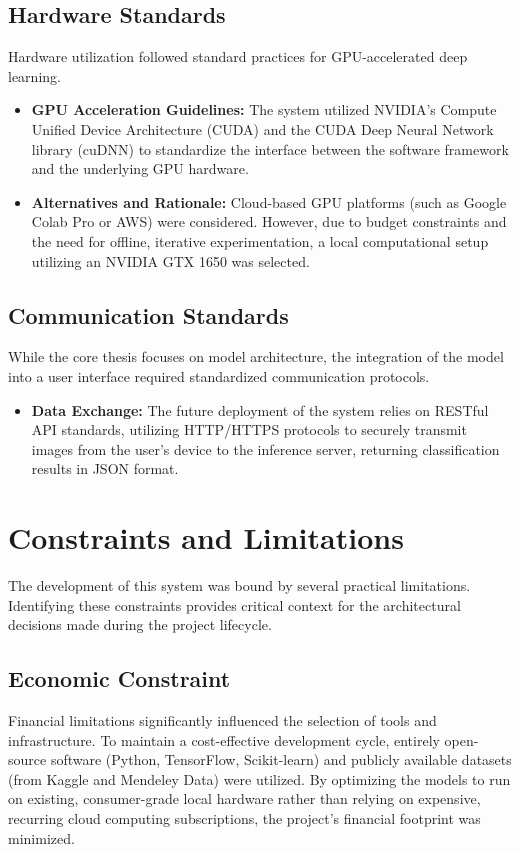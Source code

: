 \subsection{Hardware Standards}
Hardware utilization followed standard practices for GPU-accelerated deep learning.
\begin{itemize}
    \item \textbf{GPU Acceleration Guidelines:} The system utilized NVIDIA's Compute Unified Device Architecture (CUDA) and the CUDA Deep Neural Network library (cuDNN) to standardize the interface between the software framework and the underlying GPU hardware.
    \item \textbf{Alternatives and Rationale:} Cloud-based GPU platforms (such as Google Colab Pro or AWS) were considered. However, due to budget constraints and the need for offline, iterative experimentation, a local computational setup utilizing an NVIDIA GTX 1650 was selected.
\end{itemize}

\subsection{Communication Standards}
While the core thesis focuses on model architecture, the integration of the model into a user interface required standardized communication protocols.
\begin{itemize}
    \item \textbf{Data Exchange:} The future deployment of the system relies on RESTful API standards, utilizing HTTP/HTTPS protocols to securely transmit images from the user's device to the inference server, returning classification results in JSON format.
\end{itemize}

\section{Constraints and Limitations}

The development of this system was bound by several practical limitations. Identifying these constraints provides critical context for the architectural decisions made during the project lifecycle.

\subsection{Economic Constraint}
Financial limitations significantly influenced the selection of tools and infrastructure. To maintain a cost-effective development cycle, entirely open-source software (Python, TensorFlow, Scikit-learn) and publicly available datasets (from Kaggle and Mendeley Data) were utilized. By optimizing the models to run on existing, consumer-grade local hardware rather than relying on expensive, recurring cloud computing subscriptions, the project's financial footprint was minimized.

